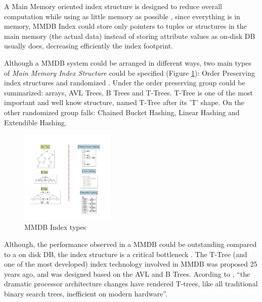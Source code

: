 \documentclass[12pt]{article} %
\begin{document}
A Main Memory oriented index structure is designed to reduce overall computation while using as little memory as possible \cite{lehman1986study}, since everything is in memory, MMDB Index could store only pointers to tuples or structures in the main memory (the actual data) instead of storing attribute values as on-disk DB usually does, decreasing efficiently the index footprint.

Although a MMDB system could be arranged in different ways, two main types of \emph{ Main Memory Index Structure } could be specified (Figure \ref{fig:fig6}): Order Preserving index structures and randomized \cite{lehman1986study}. Under the order preserving group could be summarized: arrays, AVL Trees, B Trees and T-Trees. T-Tree is one of the most important and well know structure, named T-Tree after its 'T' shape. On the other randomized group falls: Chained Bucket Hashing, Linear Hashing and Extendible Hashing.

\begin{figure}
  \vspace{-20pt}
    \centering
    \includegraphics[width=0.4\textwidth]{./pictures/fig6}
  \caption{MMDB Index types}
  \label{fig:fig6}
  \vspace{-20pt}
\end{figure}


Although, the performance observed in a MMDB could be outstanding compared to a on disk DB, the index structure is a critical bottleneck \cite{leisadaptive}. The T-Tree (and one of the most developed) index technology involved in MMDB was proposed 25 years ago, and was designed based on the AVL and B Trees. Acording to , ``the dramatic processor architecture changes have rendered T-trees, like all traditional binary search trees, inefficient on modern hardware''.
 
\end{document}
